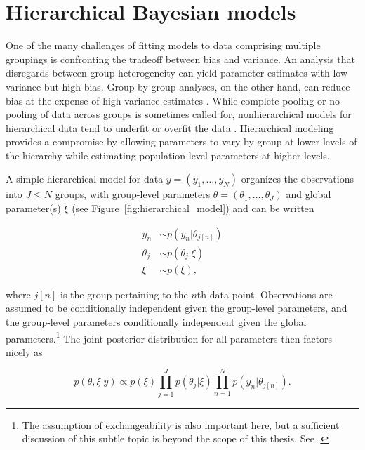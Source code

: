 \section{Hierarchical Bayesian models}
\label{hierarchical}

One of the many challenges of fitting models to data comprising multiple groupings is 
confronting the tradeoff between bias and variance. An analysis that disregards between-group 
heterogeneity can yield parameter estimates with low variance but high bias. Group-by-group 
analyses, on the other hand, can reduce bias at the expense of high-variance estimates . While complete pooling or no pooling of data across 
groups is sometimes called for, nonhierarchical models for hierarchical data tend to underfit 
or overfit the data . Hierarchical modeling provides a 
compromise by allowing parameters to vary by group at lower levels of the hierarchy while 
estimating population-level parameters at higher levels. 

A simple hierarchical model for data $y = (y_1, \dots, y_N)$ organizes the observations into $J \leq N$ 
groups, with group-level parameters $\theta = (\theta_1, \dots, \theta_J)$ and global parameter(s) $\xi$ 
(see Figure~\ref{fig:hierarchical_model}) and can be written

\begin{align*}
y_n &\sim p(y_n | \theta_{j[n]}) \\
\theta_j &\sim p(\theta_j | \xi) \\
\xi &\sim p(\xi),
\end{align*}

\noindent where $j[n]$ is the group pertaining to the $n$th data point. Observations are assumed 
to be conditionally independent given the group-level parameters, and the group-level parameters 
conditionally independent given the global parameters.\footnote{
The assumption of exchangeability is also important here, but a sufficient discussion of this subtle 
topic is beyond the scope of this thesis. See .} The joint posterior 
distribution for all parameters then factors nicely as

\begin{equation*}
 p(\theta, \xi | y) \propto p(\xi) \prod_{j=1}^J p(\theta_j | \xi) \prod_{n=1}^N p(y_n | \theta_{j[n]}). 
\end{equation*} 


